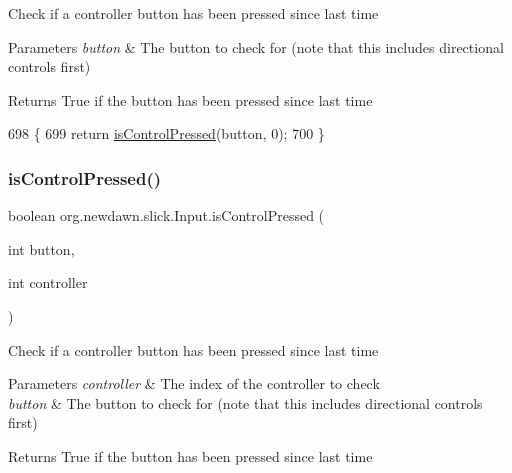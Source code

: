 Check if a controller button has been pressed since last time


\begin{DoxyParams}{Parameters}
{\em button} & The button to check for (note that this includes directional controls first) \\
\hline
\end{DoxyParams}
\begin{DoxyReturn}{Returns}
True if the button has been pressed since last time 
\end{DoxyReturn}

\begin{DoxyCode}
698                                                 \{
699         \textcolor{keywordflow}{return} \mbox{\hyperlink{classorg_1_1newdawn_1_1slick_1_1_input_a615a7b4159951d7b0f041b7df823b3fd}{isControlPressed}}(button, 0);
700     \}
\end{DoxyCode}
\mbox{\label{classorg_1_1newdawn_1_1slick_1_1_input_a0928a2783c676068dc034abbedfc6e77}} 
\subsubsection{\texorpdfstring{is\+Control\+Pressed()}{isControlPressed()}\hspace{0.1cm}{\footnotesize\ttfamily [2/2]}}
{\footnotesize\ttfamily boolean org.\+newdawn.\+slick.\+Input.\+is\+Control\+Pressed (\begin{DoxyParamCaption}\item[{int}]{button,  }\item[{int}]{controller }\end{DoxyParamCaption})\hspace{0.3cm}{\ttfamily [inline]}}

Check if a controller button has been pressed since last time


\begin{DoxyParams}{Parameters}
{\em controller} & The index of the controller to check \\
\hline
{\em button} & The button to check for (note that this includes directional controls first) \\
\hline
\end{DoxyParams}
\begin{DoxyReturn}{Returns}
True if the button has been pressed since last time 
\end{DoxyReturn}

